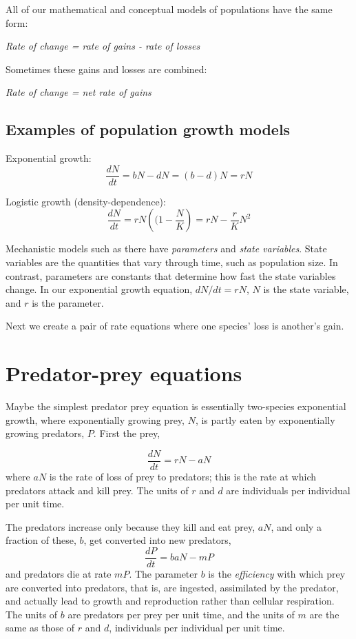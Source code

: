 \documentclass[
  letterpaper,
  DIV=11,
  numbers=noendperiod]{scrreprt}
\begin{document}
All of our mathematical and conceptual models of populations have the
same form:

\emph{Rate of change = rate of gains - rate of losses}

Sometimes these gains and losses are combined:

\emph{Rate of change = net rate of gains}

\subsection{Examples of population growth
models}\label{examples-of-population-growth-models}

Exponential growth: \[\frac{dN}{dt} = bN-dN = (b-d)N = rN\]

Logistic growth (density-dependence):
\[\frac{dN}{dt} = rN\left((1-\frac{N}{K}\right) = rN - \frac{r}{K}N^2\]

Mechanistic models such as there have \emph{parameters} and \emph{state
variables}. State variables are the quantities that vary through time,
such as population size. In contrast, parameters are constants that
determine how fast the state variables change. In our exponential growth
equation, \(dN/dt=rN\), \(N\) is the state variable, and \(r\) is the
parameter.

Next we create a pair of rate equations where one species' loss is
another's gain.

\section{Predator-prey equations}\label{predator-prey-equations}

Maybe the simplest predator prey equation is essentially two-species
exponential growth, where exponentially growing prey, \(N\), is partly
eaten by exponentially growing predators, \(P\). First the prey,

\[\frac{dN}{dt} = rN - aN\] where \(aN\) is the rate of loss of prey to
predators; this is the rate at which predators attack and kill prey. The
units of \(r\) and \(d\) are individuals per individual per unit time.

The predators increase only because they kill and eat prey, \(aN\), and
only a fraction of these, \(b\), get converted into new predators,
\[\frac{dP}{dt} = baN - mP\] and predators die at rate \(mP\). The
parameter \(b\) is the \emph{efficiency} with which prey are converted
into predators, that is, are ingested, assimilated by the predator, and
actually lead to growth and reproduction rather than cellular
respiration. The units of \(b\) are predators per prey per unit time,
and the units of \(m\) are the same as those of \(r\) and \(d\),
individuals per individual per unit time.
\end{document}
